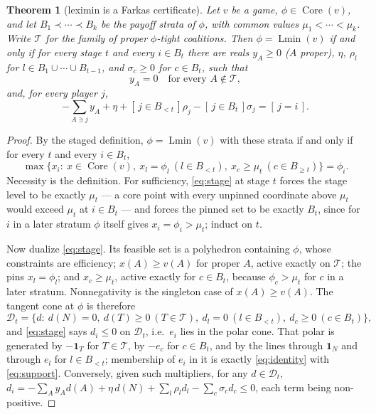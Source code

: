 \documentclass[11pt]{article}
\newtheorem{theorem}{Theorem}
\newcommand{\core}{\operatorname{Core}}
\newcommand{\Lmin}{\operatorname{Lmin}}
\newcommand{\one}{\mathbf 1}
\begin{document}
\begin{theorem}[leximin is a Farkas certificate]\label{thm:farkas}
Let $v$ be a game, $\phi\in\core(v)$, and let $B_1\prec\cdots\prec B_k$ be the
payoff strata of $\phi$, with common values $\mu_1<\cdots<\mu_k$.  Write
$\mathcal T$ for the family of proper $\phi$-tight coalitions.  Then
$\phi=\Lmin(v)$ if and only if for every stage $t$ and every $i\in B_t$ there
are reals $y_A\ge0$ ($A$ proper), $\eta$, $\rho_l$ for
$l\in B_1\cup\cdots\cup B_{t-1}$, and $\sigma_c\ge0$ for $c\in B_t$, such that
\begin{equation}\label{eq:support}
 y_A=0\quad\text{for every }A\notin\mathcal T,
\end{equation}
and, for every player $j$,
\begin{equation}\label{eq:identity}
 -\sum_{A\ni j}y_A+\eta+[\,j\in B_{<t}\,]\rho_j-[\,j\in B_t\,]\sigma_j
  =[\,j=i\,].
\end{equation}
\end{theorem}

\begin{proof}
By the staged definition, $\phi=\Lmin(v)$ with these strata if and only if for
every $t$ and every $i\in B_t$,
\begin{equation}\label{eq:stage}
 \max\{x_i:\ x\in\core(v),\ x_l=\phi_l\ (l\in B_{<t}),\
      x_c\ge\mu_t\ (c\in B_{\ge t})\}=\phi_i .
\end{equation}
Necessity is the definition.  For sufficiency, \eqref{eq:stage} at stage $t$
forces the stage level to be exactly $\mu_t$ --- a core point with every
unpinned coordinate above $\mu_t$ would exceed $\mu_t$ at $i\in B_t$ --- and
forces the pinned set to be exactly $B_t$, since for $i$ in a later stratum
$\phi$ itself gives $x_i=\phi_i>\mu_t$; induct on $t$.

Now dualize \eqref{eq:stage}.  Its feasible set is a polyhedron containing
$\phi$, whose constraints are efficiency; $x(A)\ge v(A)$ for proper $A$, active
exactly on $\mathcal T$; the pins $x_l=\phi_l$; and $x_c\ge\mu_t$, active
exactly for $c\in B_t$, because $\phi_c>\mu_t$ for $c$ in a later stratum.
Nonnegativity is the singleton case of $x(A)\ge v(A)$.  The tangent cone at
$\phi$ is therefore
\[
 \mathcal D_t=\{d:\ d(N)=0,\ d(T)\ge0\ (T\in\mathcal T),\
   d_l=0\ (l\in B_{<t}),\ d_c\ge0\ (c\in B_t)\},
\]
and \eqref{eq:stage} says $d_i\le0$ on $\mathcal D_t$, i.e.\ $e_i$ lies in the
polar cone.  That polar is generated by $-\one_T$ for $T\in\mathcal T$, by
$-e_c$ for $c\in B_t$, and by the lines through $\one_N$ and through $e_l$ for
$l\in B_{<t}$; membership of $e_i$ in it is exactly \eqref{eq:identity} with
\eqref{eq:support}.  Conversely, given such multipliers, for any
$d\in\mathcal D_t$,
$d_i=-\sum_Ay_Ad(A)+\eta\,d(N)+\sum_l\rho_ld_l-\sum_c\sigma_cd_c\le0$,
each term being non-positive.
\end{proof}
\end{document}
